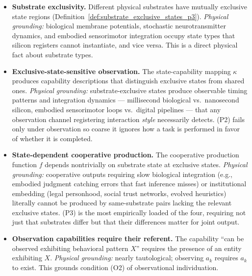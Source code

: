 \begin{itemize}
\item[\textbf{(P1)}] \textbf{Substrate exclusivity.} Different physical
    substrates have mutually exclusive state regions
    (Definition~\ref{def:substrate_exclusive_states_p3}). \emph{Physical
    grounding:} biological membrane potentials, stochastic
    neurotransmitter dynamics, and embodied sensorimotor integration
    occupy state types that silicon registers cannot instantiate, and vice
    versa. This is a direct physical fact about substrate types.

\item[\textbf{(P2)}] \textbf{Exclusive-state-sensitive observation.} The
    state-capability mapping $\kappa$ produces capability descriptions
    that distinguish exclusive states from shared ones. \emph{Physical
    grounding:} substrate-exclusive states produce observable timing
    patterns and integration dynamics --- millisecond biological vs.\
    nanosecond silicon, embodied sensorimotor loops vs.\ digital pipelines
    --- that any observation channel registering interaction \emph{style}
    necessarily detects. (P2) fails only under observation so coarse it
    ignores how a task is performed in favor of whether it is completed.

\item[\textbf{(P3)}] \textbf{State-dependent cooperative production.} The
    cooperative production function $f$ depends nontrivially on substrate
    state at exclusive states. \emph{Physical grounding:} cooperative
    outputs requiring slow biological integration (e.g., embodied judgment
    catching errors that fast inference misses) or institutional embedding
    (legal personhood, social trust networks, evolved heuristics) literally
    cannot be produced by same-substrate pairs lacking the relevant
    exclusive states. (P3) is the most empirically loaded of the four,
    requiring not just that substrates differ but that their differences
    matter for joint output.

\item[\textbf{(P4)}] \textbf{Observation capabilities require their
    referent.} The capability ``can be observed exhibiting behavioral
    pattern $X$'' requires the presence of an entity exhibiting $X$.
    \emph{Physical grounding:} nearly tautological; observing $a_k$
    requires $a_k$ to exist. This grounds condition (O2) of observational
    individuation.
\end{itemize}

